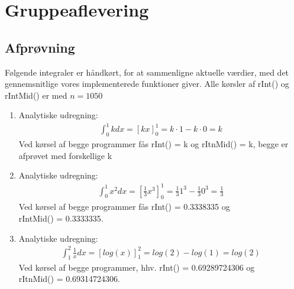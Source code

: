 \documentclass[12pt, a4paper]{article}
\begin{document}
\section*{Gruppeaflevering}
\subsection*{Afprøvning}
Følgende integraler er håndkørt, for at sammenligne aktuelle værdier, med det gennemsnitlige vores implementerede funktioner giver. Alle kørsler af rInt() og rIntMid() er med $n=1050$
\begin{enumerate}
\item Analytiske udregning:
\begin{eqnarray}
\int_0^1 k dx = [kx]_0^1 = k\cdot 1 - k\cdot 0 = k
\end{eqnarray}
Ved kørsel af begge programmer fås rInt() = k og rItnMid() = k, begge er afprøvet med forskellige k
\item Analytiske udregning:
\begin{eqnarray}
\int_0^1 x^2 dx = [\frac{1}{3}x^3]_0^1 = \frac{1}{3}1^3 - \frac{1}{3}0^3 = \frac{1}{3}
\end{eqnarray}
Ved kørsel af begge programmer fås rInt() = 0.3338335 og \\
rIntMid() = 0.3333335.
\item Analytiske udregning:
\begin{eqnarray}
\int_1^2 \frac{1}{x} dx = [log(x)]_1^2 = log(2) - log(1) = log(2)
\end{eqnarray}
Ved kørsel af begge programmer, hhv. rInt() = 0.69289724306
 og \\rItnMid() = 0.69314724306.
\end{enumerate}
\end{document}
